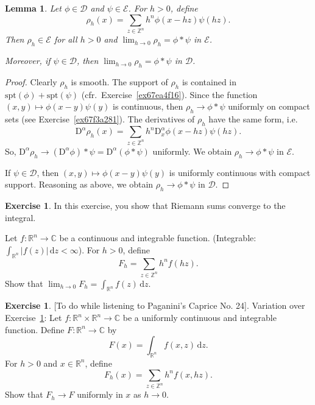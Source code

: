 \documentclass[a4paper,9pt]{amsart}
\newcommand{\scr}[1]{\mathscr{#1}}
\newcommand{\Z}{\mathbb{Z}}	%
\newcommand{\R}{\mathbb{R}}	%
\newcommand{\C}{\mathbb{C}}	%
\newcommand{\did}{\,\mathrm{d}}	%
\newcommand{\Diff}{\mathrm{D}}
\newcommand{\spt}{\mathrm{spt}}
\theoremstyle{plain}
\newtheorem{lemma}[proposition]{Lemma}
\theoremstyle{definition}
\newtheorem{exercise}[proposition]{Exercise}%
\theoremstyle{remark}
\begin{document}
\begin{lemma}\label{lem67ea55c8}
	Let $\phi\in \scr D$ and $\psi\in\scr E$.
	For $h>0$, define
	\begin{equation}
		\rho_h(x) = \sum_{z\in\Z^n} h^n \phi(x-hz) \psi(hz) .
	\end{equation}
	Then $\rho_h\in\scr E$ for all $h>0$ and
	$\lim_{h\to0} \rho_h = \phi*\psi$ in $\scr E$.
	
	Moreover, if $\psi\in\scr D$, then $\lim_{h\to0} \rho_h = \phi*\psi$ in $\scr D$.
\end{lemma}
\begin{proof}
	Clearly $\rho_h$ is smooth.
	The support of $\rho_h$ is contained in $\spt(\phi) + \spt(\psi)$ (cfr.~Exercise~\ref{ex67ea4f16}).
	Since the function $(x,y)\mapsto \phi(x-y)\psi(y)$ is continuous,
	then $\rho_h\to \phi*\psi$ uniformly on compact sets (see Exercise~\ref{ex67f3a281}).
	The derivatives of $\rho_h$ have the same form, i.e.
	\begin{equation}
		\Diff^\alpha\rho_h(x) = \sum_{z\in\Z^n} h^n \Diff^\alpha_x\phi(x-hz) \psi(hz) .
	\end{equation}
	So, $\Diff^\alpha\rho_h\to (\Diff^\alpha\phi)*\psi = \Diff^\alpha(\phi*\psi)$ uniformly.
	We obtain $\rho_h\to \phi*\psi$ in $\scr E$.
	
	If $\psi\in\scr D$, then $(x,y)\mapsto \phi(x-y)\psi(y)$ is uniformly continuous with compact support.
	Reasoning as above, we obtain $\rho_h\to \phi*\psi$ in $\scr D$.
\end{proof}

\begin{exercise}\label{ex67ea516c}
	In this exercise, you show that Riemann sums converge to the integral.
	
	Let $f:\R^n\to\C$ be a continuous and integrable function.
	(Integrable: $\int_{\R^n}|f(z)|\did z < \infty$).
	For $h>0$, define
	\begin{equation}
		F_h = \sum_{z\in\Z^n} h^n f(hz) .
	\end{equation}
	Show that $\lim_{h\to0}F_h = \int_{\R^n}f(z)\did z$.
\end{exercise}

\begin{exercise}\label{ex67ea5356}
	[To do while listening to Paganini's Caprice No. 24].
	Variation over Exercise~\ref{ex67ea516c}: 
	Let $f:\R^n\times\R^n\to\C$ be a uniformly continuous and integrable function.
	Define $F:\R^n\to\C$ by 
	\begin{equation}
		F(x) = \int_{\R^n} f(x,z) \did z .
	\end{equation}
	For $h>0$ and $x\in\R^n$, define
	\begin{equation}
		F_h(x) = \sum_{z\in\Z^n} h^n f(x,hz) .
	\end{equation}
	Show that $F_h\to F$ uniformly in $x$ as $h\to0$.
\end{exercise}
\end{document}
